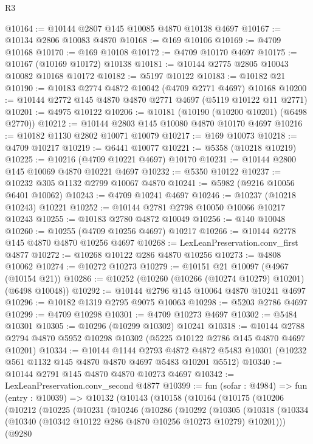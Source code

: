 \begin{lexlean}{R3}
\begin{coremodule}
@10164 := @10144 @2807 @145 @10085 @4870 @10138 @4697
@10167 := @10134 @2806 @10083 @4870
@10168 := @169 @10106
@10169 := @4709 @10168
@10170 := @169 @10108
@10172 := @4709 @10170 @4697
@10175 := @10167 (@10169 @10172) @10138
@10181 := @10144 @2775 @2805 @10043 @10082 @10168 @10172
@10182 := @5197 @10122
@10183 := @10182 @21
@10190 := @10183 @2774 @4872 @10042 (@4709 @2771 @4697) @10168
@10200 := @10144 @2772 @145 @4870 @4870 @2771 @4697 (@5119 @10122 @11 @2771)
@10201 := @4975 @10122
@10206 := @10181 (@10190 (@10200 @10201) (@6498 @2770))
@10212 := @10144 @2803 @145 @10080 @4870 @10170 @4697
@10216 := @10182 @1130 @2802 @10071 @10079
@10217 := @169 @10073
@10218 := @4709 @10217
@10219 := @6441 @10077
@10221 := @5358 (@10218 @10219)
@10225 := @10216 (@4709 @10221 @4697) @10170
@10231 := @10144 @2800 @145 @10069 @4870 @10221 @4697
@10232 := @5350 @10122
@10237 := @10232 @305 @1132 @2799 @10067 @4870
@10241 := @5982 (@9216 @10056 @6401 @10062)
@10243 := @4709 @10241 @4697
@10246 := @10237 (@10218 @10243) @10221
@10252 := @10144 @2781 @2798 @10050 @10066 @10217 @10243
@10255 := @10183 @2780 @4872 @10049
@10256 := @140 @10048
@10260 := @10255 (@4709 @10256 @4697) @10217
@10266 := @10144 @2778 @145 @4870 @4870 @10256 @4697
@10268 := LexLeanPreservation.conv_first @4877
@10272 := @10268 @10122 @286 @4870 @10256
@10273 := @4808 @10062
@10274 := @10272 @10273
@10279 := @10151 @21 @10097 (@4967 (@10154 @21))
@10286 := @10252 (@10260 (@10266 (@10274 @10279) @10201) (@6498 @10048))
@10292 := @10144 @2796 @145 @10064 @4870 @10241 @4697
@10296 := @10182 @1319 @2795 @9075 @10063
@10298 := @5203 @2786 @4697
@10299 := @4709 @10298
@10301 := @4709 @10273 @4697
@10302 := @5484 @10301
@10305 := @10296 (@10299 @10302) @10241
@10318 := @10144 @2788 @2794 @4870 @5952 @10298 @10302 (@5225 @10122 @2786 @145 @4870 @4697 @10201)
@10334 := @10144
    @1144
    @2793
    @4872
    @4872
    @5483
    @10301
    (@10232 @561 @1132 @145 @4870 @4870 @4697 @5483 @10201 @5512)
@10340 := @10144 @2791 @145 @4870 @4870 @10273 @4697
@10342 := LexLeanPreservation.conv_second @4877
@10399 := fun (sofar : @4984) =>
  fun (entry : @10039) =>
  @10132
    (@10143
      (@10158
        (@10164
          (@10175
            (@10206
              (@10212
                (@10225
                  (@10231
                    (@10246
                      (@10286
                        (@10292
                          (@10305
                            (@10318
                              (@10334
                                (@10340 (@10342 @10122 @286 @4870 @10256 @10273 @10279) @10201)))
                            (@9280

\end{coremodule}
\end{lexlean}
